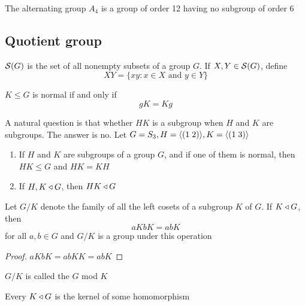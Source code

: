 \documentclass[11pt]{article}
\begin{document}
\begin{proposition}[]
The alternating group \(A_4\) is a group of order 12 having no subgroup of
order 6
\end{proposition}
\subsection{Quotient group}
\label{sec:orgd6177f4}
\(\mathcal{S}(G)\) is the set of all nonempty subsets of a group \(G\). If
\(X,Y\in\mathcal{S}(G)\), define
\begin{equation*}
XY=\{xy:x\in X\text{ and } y\in Y\}
\end{equation*}

\begin{lemma}[]
\(K\le G\) is normal if and only if
\begin{equation*}
gK=Kg
\end{equation*}
\end{lemma}

A natural question is that whether \(HK\) is a subgroup when \(H\) and \(K\) are
subgroups. The answer is no. Let \(G=S_3,H=\langle(1\;2)\rangle,K=\langle(1\;3)\rangle\)


\begin{proposition}[]
\begin{enumerate}
\item If \(H\) and \(K\) are subgroups of a group \(G\), and if one of them is normal,
then \(HK\le G\) and \(HK=KH\)
\item If \(H,K\triangleleft G\), then \(HK\triangleleft G\)
\end{enumerate}
\end{proposition}

\begin{theorem}[]
Let \(G/K\) denote the family of all the left cosets of a subgroup \(K\) of \(G\).
If \(K\triangleleft G\), then
\begin{equation*}
aKbK=abK
\end{equation*}
for all \(a,b\in G\) and \(G/K\) is a group under this operation
\end{theorem}

\begin{proof}
\(aKbK=abKK=abK\)
\end{proof}

\(G/K\) is called the  \(G\) mod \(K\)

\begin{corollary}[]
Every \(K\triangleleft G\) is the kernel of some homomorphism
\end{corollary}
\end{document}

